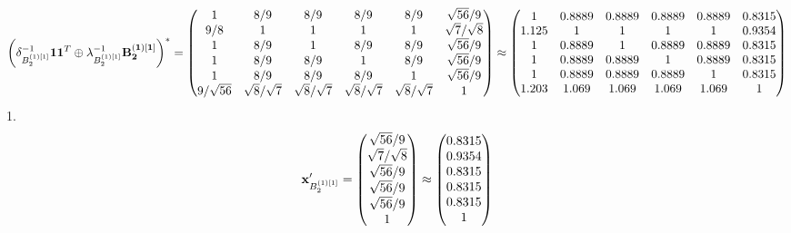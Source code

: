 \documentclass[10pt,a4paper]{article}
\begin{document}
	\[
		\left(\delta_{B_2^{(1)[1]}}^{-1}\bold{11}^T \oplus \lambda_{B_2^{(1)[1]}}^{-1}\bold{B_2^{(1)[1]}}\right)^* = 
		\begin{pmatrix}
			{1}{} & {{8}} / {{9}} & {{8}} / {{9}} & {{8}} / {{9}} & {{8}} / {{9}} & {\sqrt{56}} / {{9}} \\
			{{9}} / {{8}} & {1}{} & {1}{} & {1}{} & {1}{} & {\sqrt{7}} / {\sqrt{8}} \\
			{1}{} & {{8}} / {{9}} & {1}{} & {{8}} / {{9}} & {{8}} / {{9}} & {\sqrt{56}} / {{9}} \\
			{1}{} & {{8}} / {{9}} & {{8}} / {{9}} & {1}{} & {{8}} / {{9}} & {\sqrt{56}} / {{9}} \\
			{1}{} & {{8}} / {{9}} & {{8}} / {{9}} & {{8}} / {{9}} & {1}{} & {\sqrt{56}} / {{9}} \\
			{{9}} / {\sqrt{56}} & {\sqrt{8}} / {\sqrt{7}} & {\sqrt{8}} / {\sqrt{7}} & {\sqrt{8}} / {\sqrt{7}} & {\sqrt{8}} / {\sqrt{7}} & {1}{} \\
		\end{pmatrix}
		\approx
		\begin{pmatrix}
			1        & 0.8889   & 0.8889   & 0.8889   & 0.8889   & 0.8315   \\
			1.125    & 1        & 1        & 1        & 1        & 0.9354   \\
			1        & 0.8889   & 1        & 0.8889   & 0.8889   & 0.8315   \\
			1        & 0.8889   & 0.8889   & 1        & 0.8889   & 0.8315   \\
			1        & 0.8889   & 0.8889   & 0.8889   & 1        & 0.8315   \\
			1.203    & 1.069    & 1.069    & 1.069    & 1.069    & 1        \\
		\end{pmatrix}
	\]
	1.
	\[
		\bold{x}'_{B_2^{(1)[1]}} = 
		\begin{pmatrix}
			{\sqrt{56}} / {{9}} \\
			{\sqrt{7}} / {\sqrt{8}} \\
			{\sqrt{56}} / {{9}} \\
			{\sqrt{56}} / {{9}} \\
			{\sqrt{56}} / {{9}} \\
			{1}{} \\
		\end{pmatrix}
		\approx
		\begin{pmatrix}
			0.8315   \\
			0.9354   \\
			0.8315   \\
			0.8315   \\
			0.8315   \\
			1        \\
		\end{pmatrix}
	\]
\end{document}
